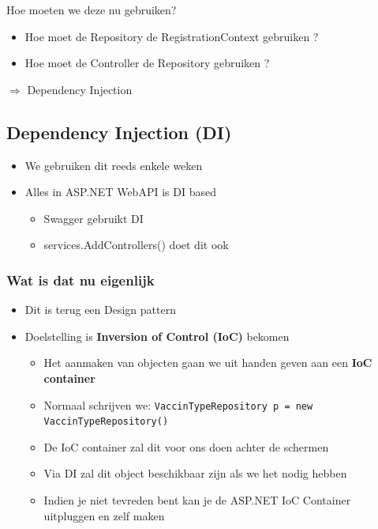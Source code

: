 \documentclass{article}
\begin{document}
Hoe moeten we deze nu gebruiken?

\begin{itemize}
    \item Hoe moet de Repository de RegistrationContext gebruiken ?
    \item Hoe moet de Controller de Repository gebruiken ?
\end{itemize}

$\Rightarrow$ Dependency Injection

\subsection{Dependency Injection (DI)}

\begin{itemize}
    \item We gebruiken dit reeds enkele weken
    \item Alles in ASP.NET WebAPI is DI based
    \begin{itemize}
        \item Swagger gebruikt DI
        \item services.AddControllers() doet dit ook
    \end{itemize}
\end{itemize}

\subsubsection{Wat is dat nu eigenlijk}

\begin{itemize}
    \item Dit is terug een Design pattern
    \item Doelstelling is \textbf{Inversion of Control (IoC)} bekomen
    \begin{itemize}
        \item Het aanmaken van objecten gaan we uit handen geven aan een \textbf{IoC container}
        \item Normaal schrijven we: \texttt{VaccinTypeRepository p = new VaccinTypeRepository()}
        \item De IoC container zal dit voor ons doen achter de schermen
        \item Via DI zal dit object beschikbaar zijn als we het nodig hebben
        \item Indien je niet tevreden bent kan je de ASP.NET IoC Container uitpluggen en zelf maken
    \end{itemize}
\end{itemize}
\end{document}
